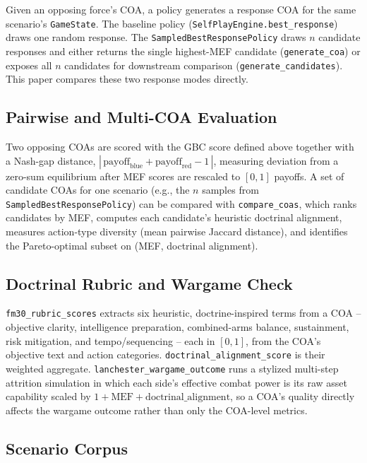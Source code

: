 \documentclass[sigconf]{acmart}
\begin{document}
Given an opposing force's COA, a policy generates a response COA for the same scenario's \texttt{GameState}. The baseline policy (\texttt{SelfPlayEngine.best\_response}) draws one random response. The \texttt{SampledBestResponsePolicy} draws $n$ candidate responses and either returns the single highest-MEF candidate (\texttt{generate\_coa}) or exposes all $n$ candidates for downstream comparison (\texttt{generate\_candidates}). This paper compares these two response modes directly.

\subsection{Pairwise and Multi-COA Evaluation}

Two opposing COAs are scored with the GBC score defined above together with a Nash-gap distance, $|\,\mathrm{payoff}_{\mathrm{blue}} + \mathrm{payoff}_{\mathrm{red}} - 1\,|$, measuring deviation from a zero-sum equilibrium after MEF scores are rescaled to $[0,1]$ payoffs. A set of candidate COAs for one scenario (e.g., the $n$ samples from \texttt{SampledBestResponsePolicy}) can be compared with \texttt{compare\_coas}, which ranks candidates by MEF, computes each candidate's heuristic doctrinal alignment, measures action-type diversity (mean pairwise Jaccard distance), and identifies the Pareto-optimal subset on (MEF, doctrinal alignment).

\subsection{Doctrinal Rubric and Wargame Check}

\texttt{fm30\_rubric\_scores} extracts six heuristic, doctrine-inspired terms from a COA -- objective clarity, intelligence preparation, combined-arms balance, sustainment, risk mitigation, and tempo/sequencing -- each in $[0,1]$, from the COA's objective text and action categories. \texttt{doctrinal\_alignment\_score} is their weighted aggregate. \texttt{lanchester\_wargame\_outcome} runs a stylized multi-step attrition simulation in which each side's effective combat power is its raw asset capability scaled by $1 + \mathrm{MEF} + \mathrm{doctrinal\_alignment}$, so a COA's quality directly affects the wargame outcome rather than only the COA-level metrics.

\subsection{Scenario Corpus}
\end{document}
